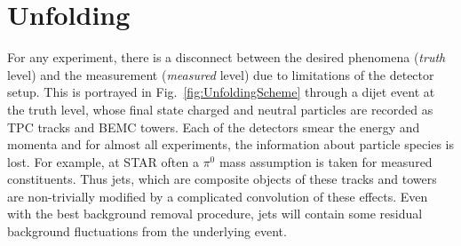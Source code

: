 \chapter{Unfolding}
\label{app:Unfolding}

For any experiment, there is a disconnect between the desired phenomena (\emph{truth} level) and the measurement (\emph{measured} level) due to limitations of the detector setup. This is portrayed in Fig.~\ref{fig:UnfoldingScheme} through a dijet event at the truth level, whose final state charged and neutral particles are recorded as TPC tracks and BEMC towers.  Each of the detectors smear the energy and momenta and for almost all experiments,  the information about particle species is lost. For example, at STAR often a \(\pi^0\) mass assumption is taken for measured constituents. Thus jets, which are composite objects of these tracks and towers are non-trivially modified by a complicated convolution of these effects. Even with the best background removal procedure, jets will contain some residual background fluctuations from the underlying event.

